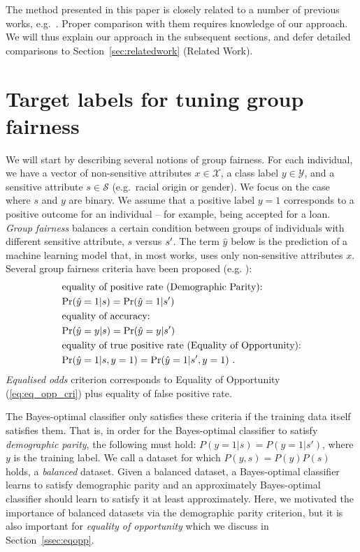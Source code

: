The method presented in this paper is closely related to a number of previous works,
e.g.\ \citet{kamiran2012data,calders2010three}.
Proper comparison with them requires knowledge of our approach.
We will thus explain our approach in the subsequent sections, and defer detailed comparisons to Section~\ref{sec:relatedwork} (Related Work).

\section{Target labels for tuning group fairness}
We will start by describing several notions of group fairness.
For each individual, we have a vector of non-sensitive attributes $x\in\mathcal{X}$, a class label $y\in\mathcal{Y}$, and a sensitive attribute $s\in\mathcal{S}$ (e.g.\ racial origin or gender).
%
We focus on the case where $s$ and $y$ are binary. 
%
We assume that a positive label $y=1$ corresponds to a positive outcome for an individual -- for example, being accepted for a loan.
%
%
\emph{Group fairness} balances a certain condition between groups of individuals with different sensitive attribute, $s$ versus $s\sp{\prime}$. 
%
The term $\hat{y}$ below is the prediction of a machine learning model that,
in most works, uses only non-sensitive attributes $x$.
%
Several group fairness criteria have been proposed (e.g. \cite{zafar2017fairnesstreatment,chouldechova2017fair,hardt2016equality}):
\begin{align}
& \text{equality of positive rate (Demographic Parity):}\nonumber\\
& \text{Pr}(\hat{y}=1|s)=\text{Pr}(\hat{y}=1|s\sp{\prime}) \label{eq:eq_dem_par}\\
& \text{equality of accuracy:}\nonumber\\
& \text{Pr}(\hat{y}=y|s)=\text{Pr}(\hat{y}=y|s\sp{\prime}) \\
& \text{equality of true positive rate (Equality of Opportunity):} \nonumber\\
& \text{Pr}(\hat{y}=1|s,y=1)=\text{Pr}(\hat{y}=1|s\sp{\prime},y=1)  \label{eq:eq_opp_cri}~.
\end{align}
\emph{Equalised odds} criterion corresponds to Equality of Opportunity (\ref{eq:eq_opp_cri}) plus equality of false positive rate.

The Bayes-optimal classifier only satisfies these criteria if the training data itself satisfies them.
That is, in order for the Bayes-optimal classifier to satisfy \emph{demographic parity}, the following must hold:
$P(y=1|s) = P(y=1|s\prime)$, where $y$ is the training label.
We call a dataset for which $P(y, s)=P(y)P(s)$ holds, a \emph{balanced} dataset.
Given a balanced dataset, a Bayes-optimal classifier learns to satisfy demographic parity
and an approximately Bayes-optimal classifier should learn to satisfy it at least approximately.
Here, we motivated the importance of balanced datasets via the demographic parity criterion,
but it is also important for \emph{equality of opportunity} which we discuss in Section~\ref{ssec:eqopp}.

